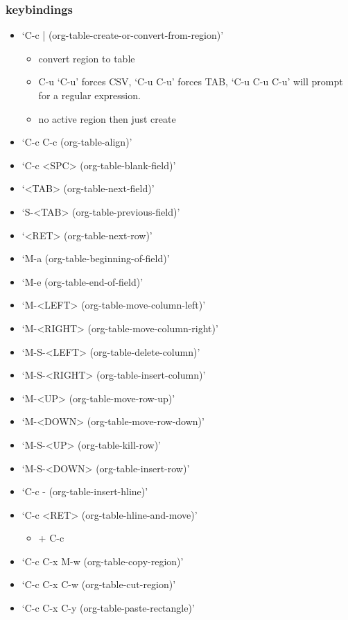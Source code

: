\documentclass[11pt]{article}
\begin{document}
\subsubsection{keybindings}
\label{sec:org8bf0781}
\begin{itemize}
\item ‘C-c |     (org-table-create-or-convert-from-region)’
\begin{itemize}
\item convert region to table
\item C-u ‘C-u’ forces CSV, ‘C-u C-u’ forces TAB, ‘C-u C-u C-u’ will prompt for a regular expression.
\item no active region then just create
\end{itemize}
\item ‘C-c C-c     (org-table-align)’
\item ‘C-c <SPC>     (org-table-blank-field)’
\item ‘<TAB>     (org-table-next-field)’
\item ‘S-<TAB>     (org-table-previous-field)’
\item ‘<RET>     (org-table-next-row)’
\item ‘M-a     (org-table-beginning-of-field)’
\item ‘M-e     (org-table-end-of-field)’
\item ‘M-<LEFT>     (org-table-move-column-left)’
\item ‘M-<RIGHT>     (org-table-move-column-right)’
\item ‘M-S-<LEFT>     (org-table-delete-column)’
\item ‘M-S-<RIGHT>     (org-table-insert-column)’
\item ‘M-<UP>     (org-table-move-row-up)’
\item ‘M-<DOWN>     (org-table-move-row-down)’
\item ‘M-S-<UP>     (org-table-kill-row)’
\item ‘M-S-<DOWN>     (org-table-insert-row)’
\item ‘C-c -     (org-table-insert-hline)’
\item ‘C-c <RET>     (org-table-hline-and-move)’
\begin{itemize}
\item + C-c
\end{itemize}
\item ‘C-c C-x M-w     (org-table-copy-region)’
\item ‘C-c C-x C-w     (org-table-cut-region)’
\item ‘C-c C-x C-y     (org-table-paste-rectangle)’

\end{itemize}
\end{document}
